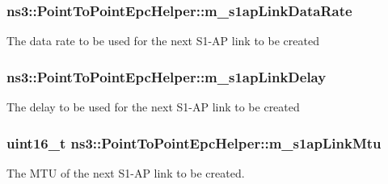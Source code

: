 \subsubsection[{\texorpdfstring{m\+\_\+s1ap\+Link\+Data\+Rate}{m_s1apLinkDataRate}}]{ ns3\+::\+Point\+To\+Point\+Epc\+Helper\+::m\+\_\+s1ap\+Link\+Data\+Rate\hspace{0.3cm}{\ttfamily [private]}}\hypertarget{classns3_1_1PointToPointEpcHelper_a732626ace34876e4846d9d86b191100c}{}\label{classns3_1_1PointToPointEpcHelper_a732626ace34876e4846d9d86b191100c}
The data rate to be used for the next S1-\/\+AP link to be created 
\subsubsection[{\texorpdfstring{m\+\_\+s1ap\+Link\+Delay}{m_s1apLinkDelay}}]{ ns3\+::\+Point\+To\+Point\+Epc\+Helper\+::m\+\_\+s1ap\+Link\+Delay\hspace{0.3cm}{\ttfamily [private]}}\hypertarget{classns3_1_1PointToPointEpcHelper_aa396ad3f7fa4f88cea85ffc61481afb1}{}\label{classns3_1_1PointToPointEpcHelper_aa396ad3f7fa4f88cea85ffc61481afb1}
The delay to be used for the next S1-\/\+AP link to be created 
\subsubsection[{\texorpdfstring{m\+\_\+s1ap\+Link\+Mtu}{m_s1apLinkMtu}}]{\setlength{\rightskip}{0pt plus 5cm}uint16\+\_\+t ns3\+::\+Point\+To\+Point\+Epc\+Helper\+::m\+\_\+s1ap\+Link\+Mtu\hspace{0.3cm}{\ttfamily [private]}}\hypertarget{classns3_1_1PointToPointEpcHelper_a1ca7acd9a9e782276d5580fd48bcda72}{}\label{classns3_1_1PointToPointEpcHelper_a1ca7acd9a9e782276d5580fd48bcda72}
The M\+TU of the next S1-\/\+AP link to be created. 
